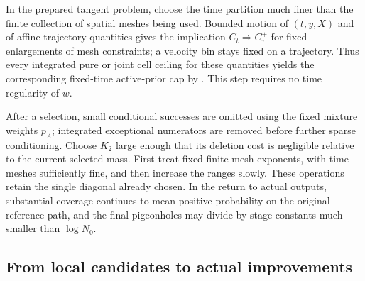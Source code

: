 In the prepared tangent problem, choose the time partition much finer
than the finite collection of spatial meshes being used.  Bounded motion
of \((t,y,X)\) and of affine trajectory quantities gives the implication
\(C_t\Rightarrow C^+_\tau\) for fixed enlargements of mesh constraints;
a velocity bin stays fixed on a trajectory.  Thus every integrated pure
or joint cell ceiling for these quantities yields the corresponding
fixed-time active-prior cap by .
This step requires no time regularity of \(w\).

After a selection, small conditional successes are omitted using the
fixed mixture weights \(p_A\); integrated exceptional numerators are
removed before further sparse conditioning.  Choose \(K_2\) large
enough that its deletion cost is negligible relative to the current
selected mass.  First treat fixed finite mesh exponents, with time
meshes sufficiently fine, and then increase the ranges slowly.
These operations retain the single diagonal already chosen.  In the
return to actual outputs, substantial coverage continues to mean
positive probability on the original reference path, and the final
pigeonholes may divide by stage constants much smaller than
\(\log N_0\).

\subsection{From local candidates to actual improvements}


